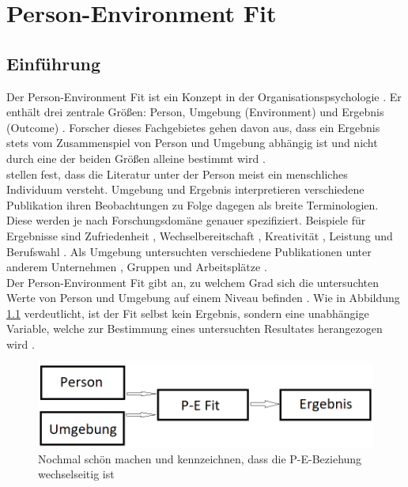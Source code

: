 \chapter{Person-Environment Fit}
\label{ch:personEnvironmentFit}

\section{Einführung}
\label{ch:personEnvironmentFit:einfuehrung}
Der Person-Environment Fit ist ein Konzept in der Organisationspsychologie \cite[S. 1f.]{edwards:2008}. Er enthält drei zentrale Größen: Person, Umgebung (Environment) und Ergebnis (Outcome) \cite[S. 2f.]{livingstone:1997}. Forscher dieses Fachgebietes gehen davon aus, dass ein Ergebnis stets vom Zusammenspiel von Person und Umgebung abhängig ist und nicht durch eine der beiden Größen alleine bestimmt wird \cite[S. 1]{muchinsky:1987}.\\
\textcite[S. 5]{edwards:2007} stellen fest, dass die Literatur unter der Person meist ein menschliches Individuum versteht. Umgebung und Ergebnis interpretieren verschiedene Publikation ihren Beobachtungen zu Folge dagegen als breite Terminologien. Diese werden je nach Forschungsdomäne genauer spezifiziert. Beispiele für Ergebnisse sind Zufriedenheit \cite[S. 1]{lashani:2021}, Wechselbereitschaft \cite[S. 1]{amarneh:2021}, Kreativität \cite[S. 1]{duan:2019}, Leistung \cite[S. 7f.]{elfenbein:2007} und  Berufswahl \cite[S. 1]{cable:1996}. Als Umgebung untersuchten verschiedene Publikationen unter anderem Unternehmen \cite[S. 1]{kristof:1996}, Gruppen \cite[S. 1]{werbel:2001} und Arbeitsplätze \cite[S. 1]{lu:2014}.\\
Der Person-Environment Fit gibt an, zu welchem Grad sich die untersuchten Werte von Person und Umgebung auf einem Niveau befinden \cite[S. 3]{chatman:1989}. Wie in Abbildung \ref{fig:personEnvironmentFit:einfuehrung:abb1} verdeutlicht, ist der Fit selbst kein Ergebnis, sondern eine unabhängige Variable, welche zur Bestimmung eines untersuchten Resultates herangezogen wird \cite[S. 4f.]{edwards:1991}.\\
\begin{figure}[h]
	\centering
	\includegraphics[width=1\textwidth]{gfx/P-E Fit.png}
	\caption{Nochmal schön machen und kennzeichnen, dass die P-E-Beziehung wechselseitig ist}
	\label{fig:personEnvironmentFit:einfuehrung:abb1}
\end{figure}\\
